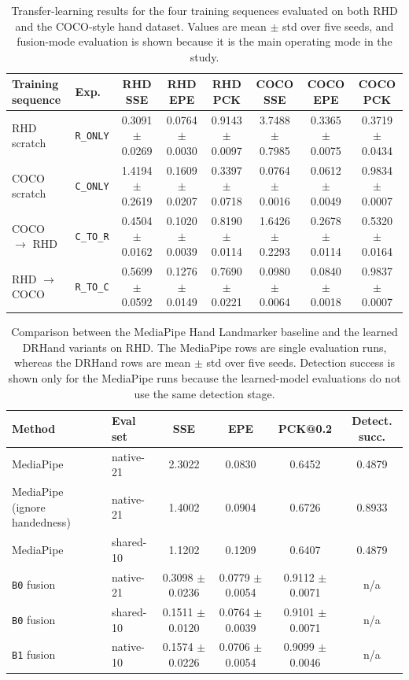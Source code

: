 \documentclass[10pt,letterpaper,twocolumn]{article}
\begin{document}
\begin{table}[H]
\centering
\footnotesize
\caption{Transfer-learning results for the four training sequences evaluated on both RHD and the COCO-style hand dataset. Values are mean $\pm$ std over five seeds, and fusion-mode evaluation is shown because it is the main operating mode in the study.}
\label{tab:transfer_learning}
\begin{tabular}{llcccccc}
\toprule
Training sequence & Exp. & RHD SSE & RHD EPE & RHD PCK & COCO SSE & COCO EPE & COCO PCK \\
\midrule
RHD scratch & \texttt{R\_ONLY} & 0.3091 $\pm$ 0.0269 & 0.0764 $\pm$ 0.0030 & 0.9143 $\pm$ 0.0097 & 3.7488 $\pm$ 0.7985 & 0.3365 $\pm$ 0.0075 & 0.3719 $\pm$ 0.0434 \\
COCO scratch & \texttt{C\_ONLY} & 1.4194 $\pm$ 0.2619 & 0.1609 $\pm$ 0.0207 & 0.3397 $\pm$ 0.0718 & 0.0764 $\pm$ 0.0016 & 0.0612 $\pm$ 0.0049 & 0.9834 $\pm$ 0.0007 \\
COCO $\rightarrow$ RHD & \texttt{C\_TO\_R} & 0.4504 $\pm$ 0.0162 & 0.1020 $\pm$ 0.0039 & 0.8190 $\pm$ 0.0114 & 1.6426 $\pm$ 0.2293 & 0.2678 $\pm$ 0.0114 & 0.5320 $\pm$ 0.0164 \\
RHD $\rightarrow$ COCO & \texttt{R\_TO\_C} & 0.5699 $\pm$ 0.0592 & 0.1276 $\pm$ 0.0149 & 0.7690 $\pm$ 0.0221 & 0.0980 $\pm$ 0.0064 & 0.0840 $\pm$ 0.0018 & 0.9837 $\pm$ 0.0007 \\
\bottomrule
\end{tabular}
\end{table}

\begin{table}[H]
\centering
\footnotesize
\caption{Comparison between the MediaPipe Hand Landmarker baseline and the learned DRHand variants on RHD. The MediaPipe rows are single evaluation runs, whereas the DRHand rows are mean $\pm$ std over five seeds. Detection success is shown only for the MediaPipe runs because the learned-model evaluations do not use the same detection stage.}
\label{tab:mediapipe_baseline}
\begin{tabular}{llcccc}
\toprule
Method & Eval set & SSE & EPE & PCK@0.2 & Detect. succ. \\
\midrule
MediaPipe & native-21 & 2.3022 & 0.0830 & 0.6452 & 0.4879 \\
MediaPipe (ignore handedness) & native-21 & 1.4002 & 0.0904 & 0.6726 & 0.8933 \\
MediaPipe & shared-10 & 1.1202 & 0.1209 & 0.6407 & 0.4879 \\
\texttt{B0} fusion & native-21 & 0.3098 $\pm$ 0.0236 & 0.0779 $\pm$ 0.0054 & 0.9112 $\pm$ 0.0071 & n/a \\
\texttt{B0} fusion & shared-10 & 0.1511 $\pm$ 0.0120 & 0.0764 $\pm$ 0.0039 & 0.9101 $\pm$ 0.0071 & n/a \\
\texttt{B1} fusion & native-10 & 0.1574 $\pm$ 0.0226 & 0.0706 $\pm$ 0.0054 & 0.9099 $\pm$ 0.0046 & n/a \\
\bottomrule
\end{tabular}
\end{table}
\end{document}
